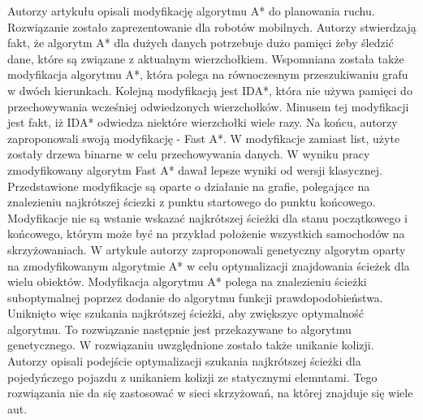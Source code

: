 \indent
Autorzy artykułu \cite{munteanmobile} opisali modyfikację algorytmu A* do planowania ruchu. Rozwiązanie zostało zaprezentowanie dla robotów mobilnych. Autorzy stwierdzają fakt, że algorytm A* dla dużych danych potrzebuje dużo pamięci żeby śledzić dane, które są związane z aktualnym wierzchołkiem. Wspomniana została także modyfikacja algorytmu A*, która polega na równoczesnym przeszukiwaniu grafu w dwóch kierunkach. Kolejną modyfikacją jest IDA*, która nie używa pamięci do przechowywania wcześniej odwiedzonych wierzchołków. Minusem tej modyfikacji jest fakt, iż IDA* odwiedza niektóre wierzchołki wiele razy. Na końcu, autorzy zaproponowali swoją modyfikację - Fast A*. W modyfikacje zamiast list, użyte zostały drzewa binarne w celu przechowywania danych. W wyniku pracy zmodyfikowany algorytm Fast A* dawał lepsze wyniki od wersji klasycznej. Przedstawione modyfikacje są oparte o działanie na grafie, polegające na znalezieniu najkrótszej ściezki z punktu startowego do punktu końcowego. Modyfikacje nie są wstanie wskazać najkrótszej ścieżki dla stanu początkowego i końcowego, którym może być na przykład położenie wszystkich samochodów na skrzyżowaniach.
\newline
\indent
W artykule \cite{oleiwi2014modified} autorzy zaproponowali genetyczny algorytm oparty na zmodyfikowanym algorytmie A* w celu optymalizacji znajdowania ścieżek dla wielu obiektów. Modyfikacja algorytmu A* polega na znalezieniu ścieżki suboptymalnej poprzez dodanie do algorytmu funkcji prawdopodobieństwa. Uniknięto więc szukania najkrótszej ścieżki, aby zwiększyc optymalność algorytmu. To rozwiązanie następnie jest przekazywane to algorytmu genetycznego. W rozwiązaniu uwzględnione zostało także unikanie kolizji. Autorzy opisali podejście optymalizacji szukania najkrótszej ścieżki dla pojedyńczego pojazdu z unikaniem kolizji ze statycznymi elemntami. Tego rozwiązania nie da się zastosować w sieci skrzyżowań, na której znajduje się wiele aut.
